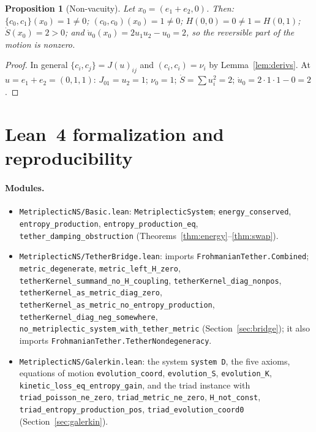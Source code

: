 \documentclass[11pt,a4paper]{article}
\newtheorem{proposition}[theorem]{Proposition}
\begin{document}
\begin{proposition}[Non-vacuity]\label{prop:nonvac}
Let \(x_0=(e_1+e_2,0)\). Then: \(\{c_0,c_1\}(x_0)=1\neq0\); \((c_0,c_0)(x_0)=1\neq0\); \(H(0,0)=0\neq1=H(0,1)\);
\(\dot S(x_0)=2>0\); and \(\dot u_0(x_0)=2u_1u_2-u_0=2\), so the reversible part of the motion is nonzero.
\end{proposition}
\begin{proof}
In general \(\{c_i,c_j\}=J(u)_{ij}\) and \((c_i,c_i)=\nu_i\) by Lemma~\ref{lem:derivs}. At \(u=e_1+e_2=(0,1,1)\):
\(J_{01}=u_2=1\); \(\nu_0=1\); \(\dot S=\sum u_i^2=2\); \(\dot u_0=2\cdot1\cdot1-0=2\).
\end{proof}

\section{Lean~4 formalization and reproducibility}\label{sec:lean}
\paragraph{Modules.}
\begingroup\raggedright
\begin{itemize}
\item \texttt{MetriplecticNS/Basic.lean}: \texttt{MetriplecticSystem}; \texttt{energy\_conserved},
\texttt{entropy\_production}, \texttt{entropy\_production\_eq}, \texttt{tether\_damping\_obstruction}
(Theorems~\ref{thm:energy}--\ref{thm:swap}).
\item \texttt{MetriplecticNS/TetherBridge.lean}: imports \texttt{FrohmanianTether.Combined};
\texttt{metric\_degenerate}, \texttt{metric\_left\_H\_zero}, \texttt{tetherKernel\_summand\_no\_H\_coupling},
\texttt{tetherKernel\_diag\_nonpos}, \texttt{tetherKernel\_as\_metric\_diag\_zero},
\texttt{tetherKernel\_as\_metric\_no\_entropy\_production}, \texttt{tetherKernel\_diag\_neg\_somewhere},
\texttt{no\_metriplectic\_system\_with\_tether\_metric} (Section~\ref{sec:bridge}); it also imports
\texttt{FrohmanianTether.TetherNondegeneracy}.
\item \texttt{MetriplecticNS/Galerkin.lean}: the system \texttt{system D}, the five axioms, equations of
motion \texttt{evolution\_coord}, \texttt{evolution\_S}, \texttt{evolution\_K},
\texttt{kinetic\_loss\_eq\_entropy\_gain}, and the triad instance with \texttt{triad\_poisson\_ne\_zero},
\texttt{triad\_metric\_ne\_zero}, \texttt{H\_not\_const}, \texttt{triad\_entropy\_production\_pos},
\texttt{triad\_evolution\_coord0} (Section~\ref{sec:galerkin}).
\end{itemize}
\endgroup
\end{document}

